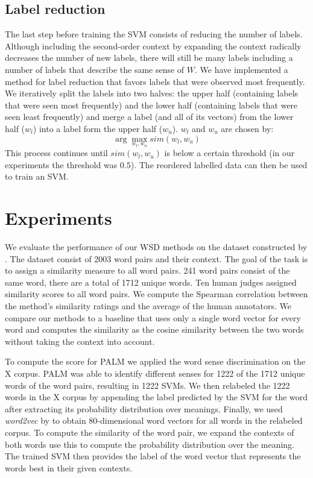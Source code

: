 \documentclass[11pt]{article}
\begin{document}
\subsection{Label reduction}
The last step before training the SVM consists of reducing the number of labels. Although including the second-order context by expanding the context radically decreases the number of new labels, there will still be many labels including a number of labels that describe the same sense of $W$. We have implemented a method for label reduction that favors labels that were observed most frequently. We iteratively split the labels into two halves: the upper half (containing labels that were seen most frequently) and the lower half (containing labels that were seen least frequently) and merge a label (and all of its vectors) from the lower half ($w_l$) into a label form the upper half ($w_u$). $w_l$ and $w_u$ are chosen by: 
$$\arg\max_{w_l, w_u} \textit{sim}(w_l, w_u)$$
This process continues until $\textit{sim}(w_l, w_u)$ is below a certain threshold (in our experiments the threshold was $0.5$).
The reordered labelled data can then be used to train an SVM.

\section{Experiments}
We evaluate the performance of our WSD methods on the dataset constructed by \cite{global}. The dataset consist of 2003 word pairs and their context. The goal of the task is to assign a similarity measure to all word pairs. 241 word pairs consist of the same word, there are a total of 1712 unique words. Ten human judges assigned similarity scores to all word pairs. We compute the Spearman correlation between the method's similarity ratings and the average of the human annotators. We compare our methods to a baseline that uses only a single word vector for every word and computes the similarity as the cosine similarity between the two words without taking the context into account. 

To compute the score for PALM we applied the word sense discrimination on the X corpus. PALM was able to identify different senses for 1222 of the 1712 unique words of the word pairs, resulting in 1222 SVMs. We then relabeled the 1222 words in the X corpus by appending the label predicted by the SVM for the word after extracting its probability distribution over meanings. Finally, we used \textit{word2vec} by \cite{word2vec} to obtain 80-dimensional word vectors for all words in the relabeled corpus. To compute the similarity of the word pair, we expand the contexts of both words use this to compute the probability distribution over the meaning. The trained SVM then provides the label of the word vector that represents the words best in their given contexts. 
\end{document}
